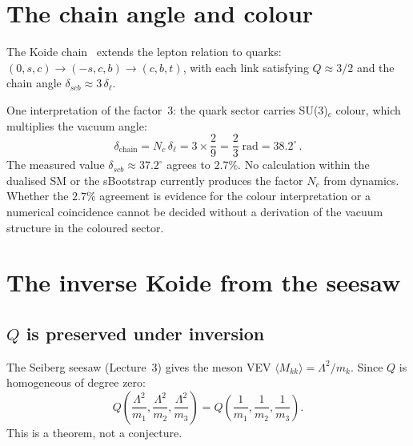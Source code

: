 \documentclass[11pt,a4paper]{article}
\newcommand{\Nc}{N_{\!c}}
\theoremstyle{definition}\newtheorem{exercise}{Exercise}[section]
\begin{document}
\section{The chain angle and colour}
\label{sec:chain}

The Koide chain~\cite{Rivero2013,Zenczykowski2012}
extends the lepton relation to quarks:
$(0,s,c) \to (-s,c,b) \to (c,b,t)$, with each link
satisfying $Q \approx 3/2$ and the chain angle
$\delta_{scb} \approx 3\,\delta_\ell$.

One interpretation of the factor~$3$: the quark sector carries
SU(3)$_c$ colour, which multiplies the vacuum angle:
\begin{equation}
  \delta_{\text{chain}} = \Nc\,\delta_\ell
  = 3\times\frac{2}{9} = \frac{2}{3}\;\text{rad}
  = 38.2^\circ\,.
  \label{eq:chain-angle}
\end{equation}
The measured value $\delta_{scb} \approx 37.2^\circ$ agrees
to $2.7\%$.  No calculation within the dualised SM or the
sBootstrap currently produces the factor $\Nc$ from dynamics.
Whether the $2.7\%$ agreement is evidence for the colour
interpretation or a numerical coincidence cannot be decided
without a derivation of the vacuum structure in the coloured
sector.

\section{The inverse Koide from the seesaw}
\label{sec:inverse}

\subsection{$Q$ is preserved under inversion}

The Seiberg seesaw (Lecture~3) gives the meson VEV
$\langle M_{kk}\rangle = \Lambda^2/m_k$.  Since $Q$ is
homogeneous of degree zero:
\begin{equation}
  Q\!\left(\frac{\Lambda^2}{m_1},\frac{\Lambda^2}{m_2},
  \frac{\Lambda^2}{m_3}\right)
  = Q\!\left(\frac{1}{m_1},\frac{1}{m_2},\frac{1}{m_3}\right).
  \label{eq:Q-inverse}
\end{equation}
This is a theorem, not a conjecture.
\end{document}
